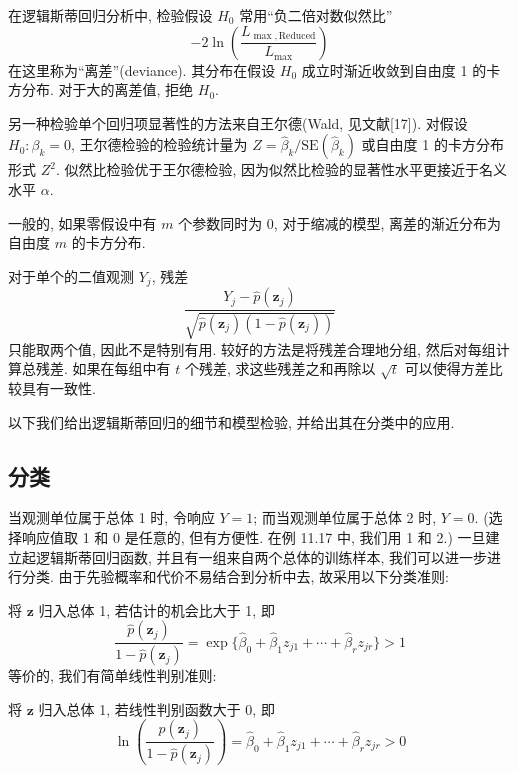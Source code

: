 
在逻辑斯蒂回归分析中, 检验假设 $H_0$ 常用“负二倍对数似然比”
\label{eq:11-76}
\begin{equation}
-2\ln\left(\frac{L_{\max,\mathrm{Reduced}}}{L_{\max}}\right)
\tag{11-76}
\end{equation}
在这里称为“离差”(deviance). 其分布在假设 $H_0$ 成立时渐近收敛到自由度 1 的卡方分布. 对于大的离差值, 拒绝 $H_0$.

另一种检验单个回归项显著性的方法来自王尔德(Wald, 见文献[17]). 对假设 $H_0:\beta_k=0$, 王尔德检验的检验统计量为 $Z=\hat{\beta}_k/\mathrm{SE}(\hat{\beta}_k)$ 或自由度 1 的卡方分布形式 $Z^2$. 似然比检验优于王尔德检验, 因为似然比检验的显著性水平更接近于名义水平 $\alpha$.

一般的, 如果零假设中有 $m$ 个参数同时为 0, 对于缩减的模型, 离差的渐近分布为自由度 $m$ 的卡方分布.

对于单个的二值观测 $Y_j$, 残差
\[
\frac{Y_j-\hat{p}(\mathbf{z}_j)}{\sqrt{\hat{p}(\mathbf{z}_j)(1-\hat{p}(\mathbf{z}_j))}}
\]
只能取两个值, 因此不是特别有用. 较好的方法是将残差合理地分组, 然后对每组计算总残差. 如果在每组中有 $t$ 个残差, 求这些残差之和再除以 $\sqrt{t}$ 可以使得方差比较具有一致性.

以下我们给出逻辑斯蒂回归的细节和模型检验, 并给出其在分类中的应用.

\subsection{分类}

当观测单位属于总体 1 时, 令响应 $Y=1$; 而当观测单位属于总体 2 时, $Y=0$. (选择响应值取 1 和 0 是任意的, 但有方便性. 在例 11.17 中, 我们用 1 和 2.) 一旦建立起逻辑斯蒂回归函数, 并且有一组来自两个总体的训练样本, 我们可以进一步进行分类. 由于先验概率和代价不易结合到分析中去, 故采用以下分类准则:

\qquad 将 $\mathbf{z}$ 归入总体 1, 若估计的机会比大于 1, 即
\[
\frac{\hat{p}(\mathbf{z}_j)}{1-\hat{p}(\mathbf{z}_j)}=\exp\{\hat{\beta}_0+\hat{\beta}_1 z_{j1}+\cdots+\hat{\beta}_r z_{jr}\}>1
\]
等价的, 我们有简单线性判别准则:

\qquad 将 $\mathbf{z}$ 归入总体 1, 若线性判别函数大于 0, 即
\label{eq:11-77}
\begin{equation}
\ln\left(\frac{\hat{p}(\mathbf{z}_j)}{1-\hat{p}(\mathbf{z}_j)}\right)=\hat{\beta}_0+\hat{\beta}_1 z_{j1}+\cdots+\hat{\beta}_r z_{jr}>0
\tag{11-77}
\end{equation}

